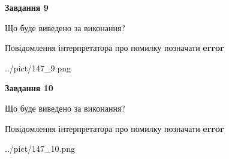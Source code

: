 \documentclass[12pt, ukrainian]{article}
\begin{document}
{{\begin {center}\textbf{Завдання 9}\end {center}}\par
Що буде виведено за виконання? \par
Повідомлення інтерпретатора про помилку позначати \textbf{error}

\begin{center}
	{../pict/147_9.png}
\end{center}
\newpage

{\begin {center}\textbf{Завдання 10}\end {center}}\par
Що буде виведено за виконання? \par
Повідомлення інтерпретатора про помилку позначати \textbf{error}

\begin{center}
	{../pict/147_10.png}
\end{center}
\newpage

}
\end{document}
